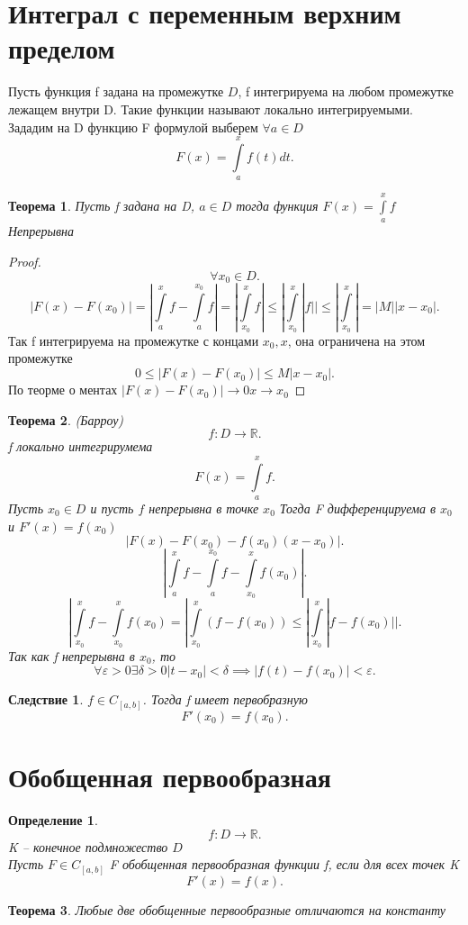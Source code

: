 \documentclass{scrartcl}
\newtheorem{theorem}{Теорема}
\newtheorem{definition}{Определение}
\newtheorem{corollary}{Следствие}[theorem]
\begin{document}
\section{Интеграл с переменным верхним пределом}
Пусть функция f задана на промежутке $D$, f интегрируема на любом промежутке лежащем внутри D. Такие функции называют локально интегрируемыми.
Зададим на D функцию F формулой выберем $\forall  a \in D$
\[
F(x) = \int\limits_{a}^{x} f(t) dt
.\] 
\begin{theorem}
    Пусть f задана на D, $a \in D$ тогда функция  $F(x) = \int\limits_{a}^{x} f 
    $ 
    Непрерывна
\end{theorem}
\begin{proof}
    \[
    \forall  x_0 \in D
    .\] 
    \[
    |F(x) - F(x_0)| = | \int\limits_{a}^{x} f - \int\limits_{a}^{x_0} f | =
    |\int\limits_{x_0}^{x} f|  \le |\int\limits_{x_0}^{x} |f| | \le |\int\limits_{x_0}^{x} | =  |M| |x - x_0|
    .\] 
    Так f интегрируема на промежутке с концами $x_0,x$, она ограничена на этом промежутке
    \[
    0 \le  |F(x) - F(x_0) | \le  M |x - x_0|
    .\] 
    По теорме о ментах $|F(x) - F(x_0)| \to 0 x \to x_0$
\end{proof}
\begin{theorem}(Барроу)
    \[
    f:D \to \mathbb{R}
    .\] 
    f локально интегрирумема
    \[
    F(x) = \int\limits_{a}^{x} f 
    .\] 
    Пусть $x_{0} \in D$ и пусть $f$ непрерывна в точке  $x_0$
    Тогда F дифференцируема в $x_0$ и $F'(x) = f(x_0)$ 
    \[
    |F(x) - F(x_0) - f(x_0) (x - x_0)|
    .\] 
    \[
    |\int\limits_{a}^{x} f - \int\limits_{a}^{x_0} f - \int\limits_{x_0}^{x} f(x_0) |
    .\] 
    \[
    |\int\limits_{x_0}^{x} f - \int\limits_{x_0}^{x} f(x_0) = |\int\limits_{x_0}^{x} (f - f(x_0)) \le  |\int\limits_{x_0}^{x} |f - f(x_0) ||
    .\] 
    Так как f непрерывна в $x_{0}$, то
    \[
    \forall  \varepsilon > 0 \exists  \delta >0  |t- x_0| < \delta \implies |f(t) - f(x_0) | < \varepsilon
    .\] 
\end{theorem}
\begin{corollary}
    $f \in C_{[a,b]}$. Тогда f имеет первобразную
    \[
    F'(x_0) = f(x_0)
    .\] 
\end{corollary}
\section{Обобщенная первообразная}
\begin{definition}
    \[
    f : D \to \mathbb{R}
    .\] 
    K -- конечное подмножество $D$\\
    Пусть  $F \in C_{[a,b]}$
    F обобщенная первообразная функции f, если для всех точек K
    \[
    F'(x) = f(x)
    .\] 
\end{definition}
\begin{theorem}
    Любые две обобщенные первообразные отличаются на константу
\end{theorem}
\end{document}
